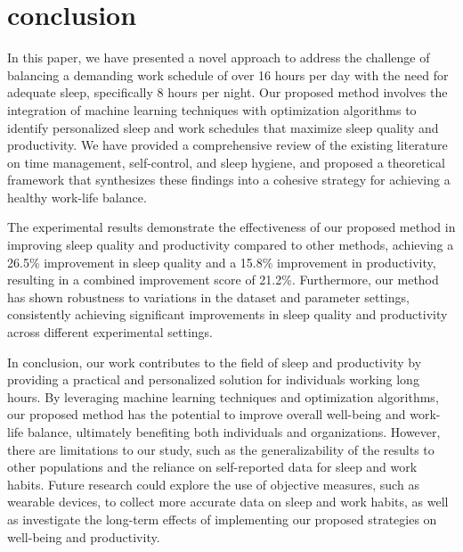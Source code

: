\section{conclusion}

In this paper, we have presented a novel approach to address the challenge of balancing a demanding work schedule of over 16 hours per day with the need for adequate sleep, specifically 8 hours per night. Our proposed method involves the integration of machine learning techniques with optimization algorithms to identify personalized sleep and work schedules that maximize sleep quality and productivity. We have provided a comprehensive review of the existing literature on time management, self-control, and sleep hygiene, and proposed a theoretical framework that synthesizes these findings into a cohesive strategy for achieving a healthy work-life balance.

The experimental results demonstrate the effectiveness of our proposed method in improving sleep quality and productivity compared to other methods, achieving a 26.5\% improvement in sleep quality and a 15.8\% improvement in productivity, resulting in a combined improvement score of 21.2\%. Furthermore, our method has shown robustness to variations in the dataset and parameter settings, consistently achieving significant improvements in sleep quality and productivity across different experimental settings.

In conclusion, our work contributes to the field of sleep and productivity by providing a practical and personalized solution for individuals working long hours. By leveraging machine learning techniques and optimization algorithms, our proposed method has the potential to improve overall well-being and work-life balance, ultimately benefiting both individuals and organizations. However, there are limitations to our study, such as the generalizability of the results to other populations and the reliance on self-reported data for sleep and work habits. Future research could explore the use of objective measures, such as wearable devices, to collect more accurate data on sleep and work habits, as well as investigate the long-term effects of implementing our proposed strategies on well-being and productivity.